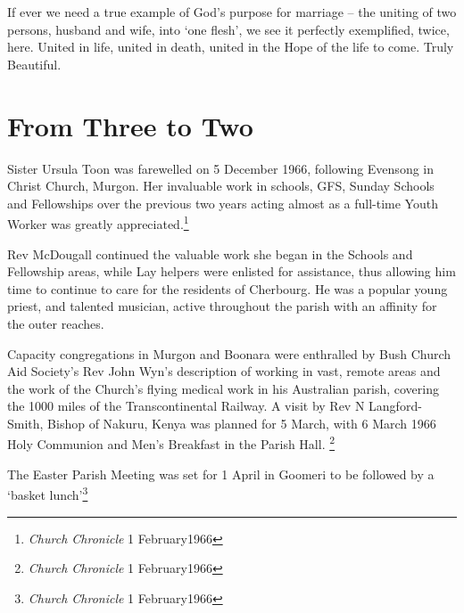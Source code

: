 If ever we need a true example of God's purpose for marriage -- the uniting of two persons, husband and wife, into `one flesh', we see it perfectly exemplified, twice, here. United in life, united in death, united in the Hope of the life to come. Truly Beautiful.





\section{From Three to Two}



Sister Ursula Toon was farewelled on 5 December 1966, following Evensong in Christ Church, Murgon. Her invaluable work in schools, GFS, Sunday Schools and Fellowships over the previous two years acting almost as a full-time Youth Worker was greatly appreciated.\footnote{\emph{Church Chronicle} 1 February1966}


Rev McDougall continued the valuable work she began in the Schools and Fellowship areas, while Lay helpers were enlisted for assistance, thus allowing him time to continue to care for the residents of Cherbourg. He was a popular young priest, and talented musician, active throughout the parish with an affinity for the outer reaches.



Capacity congregations in Murgon and Boonara were enthralled by Bush Church Aid Society's Rev John Wyn's description of working in vast, remote areas and the work of the Church's flying medical work in his Australian parish, covering the 1000 miles of the Transcontinental Railway. A visit by Rev N Langford-Smith, Bishop of Nakuru, Kenya was planned for 5 March, with 6 March 1966 Holy Communion and Men's Breakfast in the Parish Hall. \footnote{\emph{Church Chronicle} 1 February1966}


The Easter Parish Meeting was set for 1 April in Goomeri to be followed by a `basket lunch'\footnote{\emph{Church Chronicle} 1 February1966}



